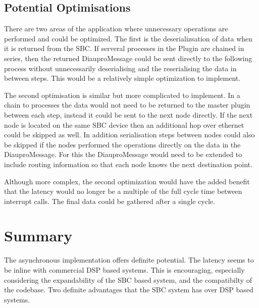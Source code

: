 \subsection{Potential Optimisations }

There are two areas of the application where unnecessary operations are performed and could be optimized. The first is the deserializsation of data when it is returned from the SBC. If serveral processes in the Plugin are chained in series, then the returned DiauproMessage could be sent directly to the following process without unnecessarily deserialising and the reserialising the data in between steps. This would be a relatively simple optimization to implement.

The second optimisation is similar but more complicated to implement. In a chain to processes the data would not need to be returned to the master plugin between each step, instead it could be sent to the next node directly. If the next node is located on the same SBC device then an additional hop over ethernet could be skipped as well. In addition serialisation steps between nodes could also be skipped if the nodes performed the operations directly on the data in the DiauproMessage. For this the DiauproMessage would need to be extended to include routing information so that each node knows the next destination point.

Although more complex, the second optimization would have the added benefit that the latency would no longer be a multiple of the full cycle time between interrupt calls. The final data could be gathered after a single cycle.

\section{Summary}

The asynchronous implementation offers definite potential. The latency seems to be inline with commercial DSP based systems\cite{UAD2-review}. This is encouraging, especially considering the expandability of the SBC based system, and the compatibilty of the codebase. Two definite advantages that the SBC system has over DSP based systems.


